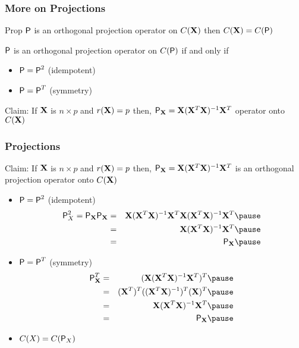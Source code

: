 \documentclass[handout]{beamer}
\begin{document}
\begin{frame} \frametitle{More on Projections}
\begin{block}{Prop}
   $\P$ is an orthogonal projection operator on $C(\X)$ then $C(\X) = C(\P)$
\end{block} \pause

\begin{theorem}
$\P$ is an orthogonal projection operator on $C(\P)$ if and
only if  \pause
\begin{itemize}
\item $\P = \P^2$  (idempotent)  \pause
\item $\P = \P^T$ (symmetry)   \pause
\end{itemize}
\end{theorem}
Claim:  If $\X$ is $n \times p$ and $r(\X) = p$ then, $\P_{\X} =
\X(\X^T\X)^{-1} \X^T$   operator  onto $C(\X)$
  
\end{frame}
\begin{frame} \frametitle{Projections}
Claim:  If $\X$ is $n \times p$ and $r(\X) = p$ then, $\P_{\X} =
\X(\X^T\X)^{-1} \X^T$  is an orthogonal projection operator  onto
$C(\X)$ \pause
 \begin{itemize}
\item $\P = \P^2$  (idempotent)  \pause
  \begin{eqnarray*}
 \P_X^2 = \P_\X \P_\X & = &\X(\X^T\X)^{-1} \X^T\X(\X^T\X)^{-1} \X^T   \pause \\
             & = & \X(\X^T\X)^{-1}\X^T \pause\\
 & = & \P_{\X} \pause
  \end{eqnarray*}

\item $\P = \P^T$ (symmetry)  \pause
 \begin{eqnarray*}
 \P_\X^T  & = & (\X(\X^T\X)^{-1}\X^T)^T \pause \\
             & = & (\X^T)^T((\X^T\X)^{-1})^T(\X)^T \pause \\
 & = &  \X(\X^T\X)^{-1}\X^T \pause \\
 & = & \P_{\X} \pause
  \end{eqnarray*}
\item $C(X) = C(\P_X)$  
\end{itemize}
\end{frame}
\end{document}
